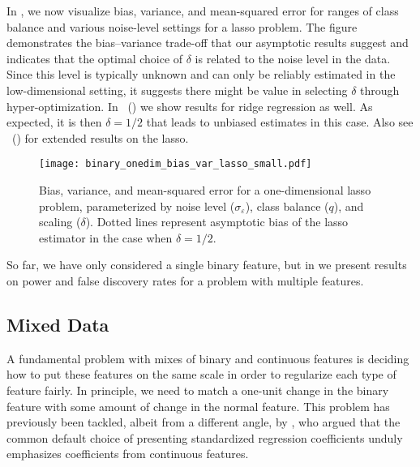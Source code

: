 
In , we now visualize bias, variance, and mean-squared
error for ranges of class balance and various noise-level settings for a lasso problem. The
figure demonstrates the bias--variance trade-off that our asymptotic results suggest and
indicates that the optimal choice of \(\delta\) is related to the noise level in the data.
Since this level is typically unknown and can only be reliably estimated in the
low-dimensional setting, it suggests there might be value in selecting \(\delta\) through
hyper-optimization. In
~() we show
results for ridge regression as well. As expected, it is then \(\delta = 1/2\) that leads
to unbiased estimates in this case. Also see
~() for extended
results on the lasso.

\begin{figure}[htb]
  \centering
  \texttt{[image: binary\_onedim\_bias\_var\_lasso\_small.pdf]}
  \caption{%
    Bias, variance, and mean-squared error for a one-dimensional lasso problem,
    parameterized by noise level (\(\sigma_\varepsilon\)), class balance (\(q\)), and
    scaling (\(\delta\)). Dotted lines represent asymptotic bias of the lasso
    estimator in the case when \(\delta = 1/2\).}
  \label{fig:bias-var-onedim-lasso}
\end{figure}

So far, we have only considered a single binary feature, but in
 we present results on power and false discovery rates for a
problem with multiple features.

\subsection{Mixed Data}%
\label{sec:mixed-data}

A fundamental problem with mixes of binary and continuous features is deciding how to put
these features on the same scale in order to regularize each type of feature fairly. In
principle, we need to match a one-unit change in the binary feature with some amount of
change in the normal feature. This problem has previously been tackled, albeit from a
different angle, by \citet{gelman2008}, who argued that the common default choice of
presenting standardized regression coefficients unduly emphasizes coefficients from
continuous features.


